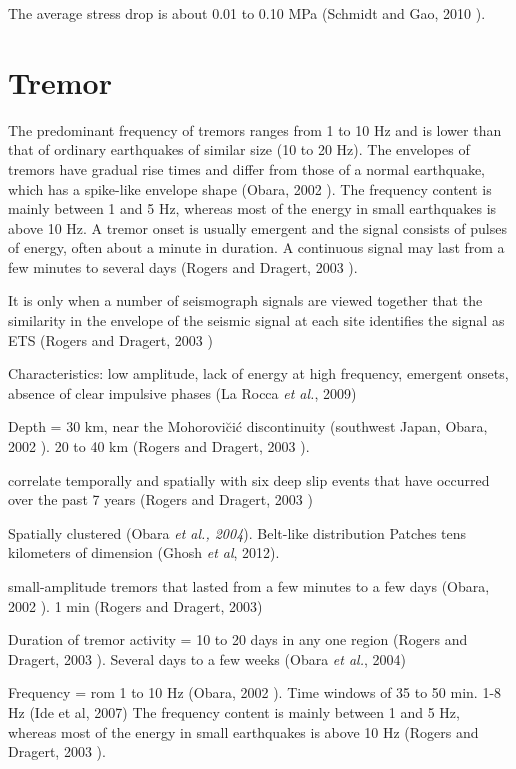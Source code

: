 \documentclass[main.tex]{subfiles}
\begin{document}
The average stress drop is about 0.01 to 0.10 MPa (Schmidt and Gao, 2010 \cite{SCH_2010}). 

\chapter{Tremor}

The predominant frequency of tremors ranges from 1 to 10 Hz and is lower than that of ordinary earthquakes of similar size (10 to 20 Hz). The envelopes of tremors have gradual rise times and differ from those of a normal earthquake, which has a spike-like envelope shape (Obara, 2002 \cite{OBA_2002}). The frequency content is mainly between 1 and 5 Hz, whereas most of the energy in small earthquakes is above 10 Hz. A tremor onset is usually emergent and the signal consists of pulses of energy, often about a minute in duration. A continuous signal may last from a few minutes to several days (Rogers and Dragert, 2003 \cite{ROG_2003}).

It is only when a number of seismograph signals are viewed together that the similarity in the envelope of the seismic signal at each site identifies the signal as ETS (Rogers and Dragert, 2003 \cite{ROG_2003})

Characteristics: low amplitude, lack of energy at high frequency, emergent onsets, absence of clear impulsive phases (La Rocca \textit{et al.}, 2009)

Depth = 30 km, near the Mohorovi\u ci\'c discontinuity (southwest Japan, Obara, 2002 \cite{OBA_2002}). 20 to 40 km (Rogers and Dragert, 2003 \cite{ROG_2003}).

correlate temporally and spatially with six deep slip events that have occurred over the past 7 years (Rogers and Dragert, 2003 \cite{ROG_2003})

Spatially clustered (Obara \textit{et al., 2004}). Belt-like distribution
Patches tens kilometers of dimension (Ghosh \textit{et al}, 2012).

small-amplitude tremors that lasted from a few minutes to a few days (Obara, 2002 \cite{OBA_2002}). 1 min (Rogers and Dragert, 2003)

Duration of tremor activity = 10 to 20 days in any one region (Rogers and Dragert, 2003 \cite{ROG_2003}). Several days to a few weeks (Obara \textit{et al.}, 2004)

Frequency = rom 1 to 10 Hz (Obara, 2002 \cite{OBA_2002}). Time windows of 35 to 50 min. 1-8 Hz (Ide et al, 2007)
The frequency content is mainly between 1 and 5 Hz, whereas most of the energy in small earthquakes is above 10 Hz (Rogers and Dragert, 2003 \cite{ROG_2003}).
\end{document}
